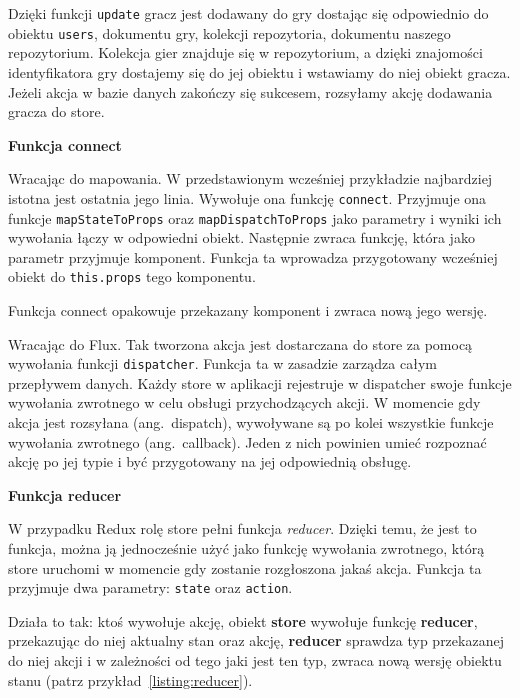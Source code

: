 Dzięki funkcji \texttt{update} gracz jest dodawany do gry dostając się odpowiednio do obiektu \texttt{users},
dokumentu gry, kolekcji repozytoria, dokumentu naszego repozytorium.
Kolekcja gier znajduje się w repozytorium, a dzięki znajomości identyfikatora gry
dostajemy się do jej obiektu i wstawiamy do niej obiekt gracza.
Jeżeli akcja w bazie danych zakończy się sukcesem, rozsyłamy akcję dodawania gracza do store.

\begin{center}
	\textbf{Funkcja connect}
\end{center}
Wracając do mapowania. W przedstawionym wcześniej przykładzie najbardziej istotna jest ostatnia jego linia.
Wywołuje ona funkcję \texttt{connect}.
Przyjmuje ona funkcje \texttt{mapStateToProps} oraz \texttt{mapDispatchToProps}
jako parametry i wyniki ich wywołania łączy w odpowiedni obiekt.
Następnie zwraca funkcję, która jako parametr przyjmuje komponent.
Funkcja ta wprowadza przygotowany wcześniej obiekt do \texttt{this.props} tego komponentu.

Funkcja connect opakowuje przekazany komponent i zwraca nową jego wersję.

Wracając do Flux. Tak tworzona akcja jest dostarczana do store za pomocą wywołania funkcji \texttt{dispatcher}.
Funkcja ta w zasadzie zarządza całym przepływem danych.
Każdy store w aplikacji rejestruje w dispatcher swoje funkcje wywołania zwrotnego
w celu obsługi przychodzących akcji.
W momencie gdy akcja jest rozsyłana (ang.\ dispatch), wywoływane są po kolei wszystkie
funkcje wywołania zwrotnego (ang.\ callback).
Jeden z nich powinien umieć rozpoznać akcję po jej typie i być przygotowany na jej odpowiednią obsługę.

\begin{center}
	\textbf{Funkcja reducer}
\end{center}

W przypadku Redux rolę store pełni funkcja \textit{reducer}. Dzięki temu, że jest to funkcja,
można ją jednocześnie użyć jako funkcję wywołania zwrotnego,
którą store uruchomi w momencie gdy zostanie rozgłoszona jakaś akcja.
Funkcja ta przyjmuje dwa parametry: \texttt{state} oraz \texttt{action}.

Działa to tak: ktoś wywołuje akcję, obiekt \textbf{store} wywołuje funkcję \textbf{reducer},
przekazując do niej aktualny stan oraz akcję, \textbf{reducer}
sprawdza typ przekazanej do niej akcji i w zależności od tego jaki jest ten typ,
zwraca nową wersję obiektu stanu (patrz przykład~\ref{listing:reducer}).

